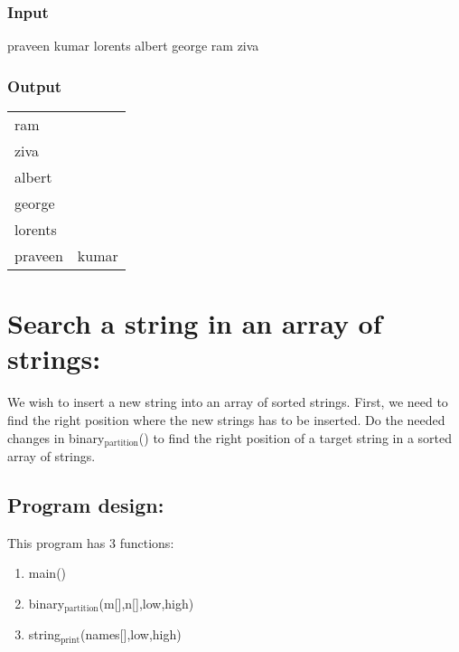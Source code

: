 \documentclass[11pt]{article}
\begin{document}
\subsubsection*{Input}
\label{sec-6-3-1}
praveen kumar
lorents
albert
george
ram
ziva
\subsubsection*{Output}
\label{sec-6-3-2}
\begin{center}
\begin{tabular}{ll}
ram & \\
ziva & \\
albert & \\
george & \\
lorents & \\
praveen & kumar\\
\end{tabular}
\end{center}

\section{Search a string in an array of strings:}
\label{sec-7}
We wish to insert a new string into an array of sorted strings. First, we need to find the right position where the new strings has to be inserted. Do the needed changes in binary$_{\text{partition}}$() to find the right position of a target string in a sorted array of strings.

\subsection*{Program design:}
\label{sec-7-1}
This program has 3 functions:
\begin{enumerate}
\item main()
\item binary$_{\text{partition}}$(m[],n[],low,high)
\item string$_{\text{print}}$(names[],low,high)
\end{enumerate}
\end{document}
